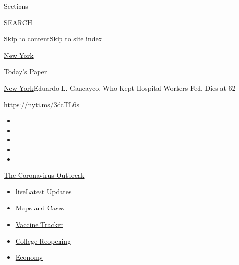 Sections

SEARCH

\protect\hyperlink{site-content}{Skip to
content}\protect\hyperlink{site-index}{Skip to site index}

\href{https://www.nytimes3xbfgragh.onion/section/nyregion}{New York}

\href{https://myaccount.nytimes3xbfgragh.onion/auth/login?response_type=cookie\&client_id=vi}{}

\href{https://www.nytimes3xbfgragh.onion/section/todayspaper}{Today's
Paper}

\href{/section/nyregion}{New York}\textbar{}Eduardo L. Gancayco, Who
Kept Hospital Workers Fed, Dies at 62

\url{https://nyti.ms/3dcTL6s}

\begin{itemize}
\item
\item
\item
\item
\item
\end{itemize}

\href{https://www.nytimes3xbfgragh.onion/news-event/coronavirus?action=click\&pgtype=Article\&state=default\&region=TOP_BANNER\&context=storylines_menu}{The
Coronavirus Outbreak}

\begin{itemize}
\tightlist
\item
  live\href{https://www.nytimes3xbfgragh.onion/2020/08/04/world/coronavirus-covid-19.html?action=click\&pgtype=Article\&state=default\&region=TOP_BANNER\&context=storylines_menu}{Latest
  Updates}
\item
  \href{https://www.nytimes3xbfgragh.onion/interactive/2020/us/coronavirus-us-cases.html?action=click\&pgtype=Article\&state=default\&region=TOP_BANNER\&context=storylines_menu}{Maps
  and Cases}
\item
  \href{https://www.nytimes3xbfgragh.onion/interactive/2020/science/coronavirus-vaccine-tracker.html?action=click\&pgtype=Article\&state=default\&region=TOP_BANNER\&context=storylines_menu}{Vaccine
  Tracker}
\item
  \href{https://www.nytimes3xbfgragh.onion/2020/08/02/us/covid-college-reopening.html?action=click\&pgtype=Article\&state=default\&region=TOP_BANNER\&context=storylines_menu}{College
  Reopening}
\item
  \href{https://www.nytimes3xbfgragh.onion/live/2020/08/03/business/stock-market-today-coronavirus?action=click\&pgtype=Article\&state=default\&region=TOP_BANNER\&context=storylines_menu}{Economy}
\end{itemize}

